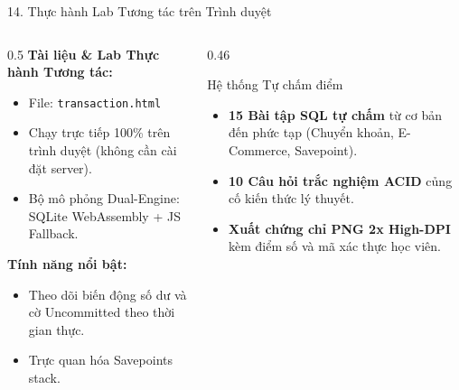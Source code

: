 \documentclass[aspectratio=169,11pt]{beamer}
\newcommand{\code}[1]{\texttt{#1}}
\begin{document}
\begin{frame}{14. Thực hành Lab Tương tác trên Trình duyệt}
  \begin{columns}[T]
    \begin{column}{0.5\textwidth}
      \textbf{Tài liệu \& Lab Thực hành Tương tác:}
      \begin{itemize}
        \item File: \code{transaction.html}
        \item Chạy trực tiếp 100\% trên trình duyệt (không cần cài đặt server).
        \item Bộ mô phỏng Dual-Engine: SQLite WebAssembly + JS Fallback.
      \end{itemize}
      \vspace{0.3em}
      \textbf{Tính năng nổi bật:}
      \begin{itemize}
        \item Theo dõi biến động số dư và cờ Uncommitted theo thời gian thực.
        \item Trực quan hóa Savepoints stack.
      \end{itemize}
    \end{column}
    \begin{column}{0.46\textwidth}
      \begin{exampleblock}{Hệ thống Tự chấm điểm}
        \begin{itemize}
          \item \textbf{15 Bài tập SQL tự chấm} từ cơ bản đến phức tạp (Chuyển khoản, E-Commerce, Savepoint).
          \item \textbf{10 Câu hỏi trắc nghiệm ACID} củng cố kiến thức lý thuyết.
          \item \textbf{Xuất chứng chỉ PNG 2x High-DPI} kèm điểm số và mã xác thực học viên.
        \end{itemize}
      \end{exampleblock}
    \end{column}
  \end{columns}
\end{frame}
\end{document}
